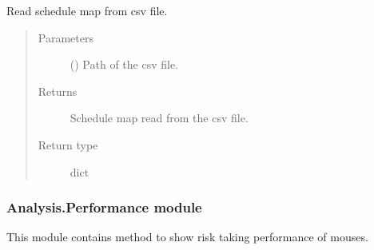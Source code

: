 \documentclass[letterpaper,10pt,english]{sphinxmanual}
\begin{document}

\begin{fulllineitems}
\label{\detokenize{NoSeMazeControl/Analysis:Analysis.Conversion.read_schedule_map}}
\pysigstartsignatures
{}
\pysigstopsignatures
\sphinxAtStartPar
Read schedule map from csv file.
\begin{quote}\begin{description}
\item[{Parameters}] \leavevmode
\sphinxAtStartPar
{} () \textendash{} Path of the csv file.

\item[{Returns}] \leavevmode
\sphinxAtStartPar
{} \textendash{} Schedule map read from the csv file.

\item[{Return type}] \leavevmode
\sphinxAtStartPar
dict

\end{description}\end{quote}

\end{fulllineitems}


\begin{DUlineblock}{0em}
\item[] 
\end{DUlineblock}


\subsubsection{Analysis.Performance module}
\label{\detokenize{NoSeMazeControl/Analysis:module-Analysis.Performance}}\label{\detokenize{NoSeMazeControl/Analysis:analysis-performance-module}}
\sphinxAtStartPar
This module contains method to show risk taking performance of mouses.
\end{document}
